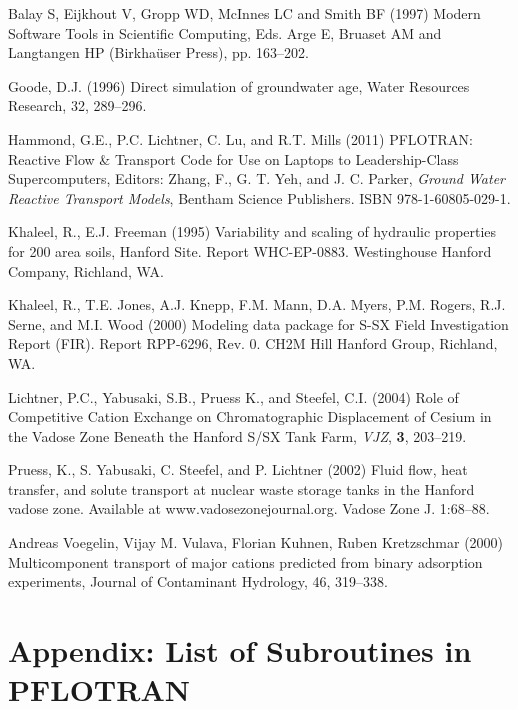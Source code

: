 \documentclass[12pt]{article}
\begin{document}
\begin{description}

\item Balay S, Eijkhout V, Gropp WD, McInnes LC and Smith BF (1997) Modern Software Tools in Scientific Computing, Eds. Arge E, Bruaset AM and Langtangen HP (Birkha\"user Press), pp. 163--202.

\item Goode, D.J. (1996) Direct simulation of groundwater age, Water Resources Research, 32, 289--296.

\item Hammond, G.E., P.C. Lichtner, C. Lu, and R.T. Mills (2011) PFLOTRAN: Reactive Flow \& Transport Code for Use on Laptops to Leadership-Class Supercomputers, Editors: Zhang, F., G. T. Yeh, and J. C. Parker,
{\em Ground Water Reactive Transport Models},
Bentham Science Publishers.
ISBN 978-1-60805-029-1. 

\item Khaleel, R., E.J. Freeman (1995) Variability and scaling of hydraulic properties for 200 area soils, Hanford Site. Report WHC-EP-0883. Westinghouse Hanford Company, Richland, WA.

\item Khaleel, R., T.E. Jones, A.J. Knepp, F.M. Mann, D.A. Myers, P.M. Rogers, R.J. Serne, and M.I. Wood (2000) Modeling data package for S-SX Field Investigation Report (FIR). Report RPP-6296, Rev. 0. CH2M Hill Hanford Group, Richland, WA.

\item Lichtner, P.C., Yabusaki, S.B., Pruess K., and Steefel, C.I. (2004) Role of Competitive Cation Exchange on Chromatographic Displacement of Cesium in the Vadose Zone Beneath the Hanford S/SX Tank Farm, {\em VJZ}, {\bf 3}, 203--219.

\item Pruess, K., S. Yabusaki, C. Steefel, and P. Lichtner (2002) Fluid flow,
heat transfer, and solute transport at nuclear waste storage tanks in the Hanford vadose zone. Available at www.vadosezonejournal.org. Vadose Zone J. 1:68--88.

\item Andreas Voegelin, Vijay M. Vulava, Florian Kuhnen, Ruben Kretzschmar (2000) Multicomponent transport of major cations predicted from binary adsorption experiments, Journal of Contaminant Hydrology, 46, 319--338.
\end{description}

\newpage

\section{Appendix: List of Subroutines in PFLOTRAN}
\end{document}
